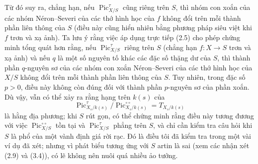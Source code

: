  Từ đó suy ra, chẳng hạn, nếu
$\operatorname{Pic}_{X/S}^\tau$ cũng riêng trên $S$, thì nhóm con xoắn của các
nhóm Néron--Severi của các thớ hình học của $f$ không đổi trên mỗi thành phần
liên thông của $S$ (điều này cũng hiển nhiên bằng phương pháp siêu việt khi
$f$ trơn và xạ ảnh). Ta lưu ý rằng việc áp dụng trực tiếp (2.5) cho phép chứng
minh tổng quát hơn rằng, nếu $\operatorname{Pic}_{X/S}^\tau$ riêng trên $S$ (chẳng
hạn $f:X\longrightarrow S$ trơn và xạ ảnh) và nếu $q$ là một số nguyên tố
khác các đặc số thặng dư của $S$, thì thành phần $q$-nguyên sơ của các nhóm
con xoắn Néron--Severi của các thớ hình học của $X/S$ không đổi trên mỗi thành
phần liên thông của $S$. Tuy nhiên, trong đặc số $p>0$, điều này không còn đúng
đối với thành phần $p$-nguyên sơ của phần xoắn. Dù vậy, vẫn có thể xảy ra rằng
hạng trên $k(s)$ của
\[
\operatorname{Pic}_{X_s/k(s)}^\tau/
\operatorname{Pic}_{X_s/k(s)}^{\circ\circ}=T_{X_s/k(s)}
\]
là hằng địa phương; khi $S$ rút gọn, có thể chứng minh rằng điều này tương
đương với việc $\operatorname{Pic}_{X/S}^{\circ\circ}$ tồn tại và
$\operatorname{Pic}_{X/S}^\tau$ phẳng trên $S$, và chỉ cần kiểm tra câu hỏi
khi $S$ là phổ của một vành định giá rời rạc. Đó là điều tôi đã kiểm tra trong
một vài ví dụ đã xét; nhưng vì phát biểu tương ứng với $S$ artin là sai (xem
các nhận xét (2.9) và (3.4)), có lẽ không nên nuôi quá nhiều ảo tưởng.


